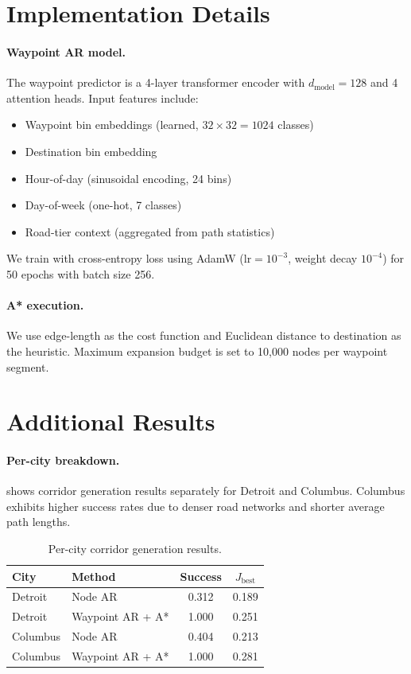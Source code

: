 \section{Implementation Details}
\label{app:impl}

\paragraph{Waypoint AR model.}
The waypoint predictor is a 4-layer transformer encoder with $d_{\mathrm{model}}=128$ and 4 attention heads.
Input features include:
\begin{itemize}
  \item Waypoint bin embeddings (learned, $32 \times 32 = 1024$ classes)
  \item Destination bin embedding
  \item Hour-of-day (sinusoidal encoding, 24 bins)
  \item Day-of-week (one-hot, 7 classes)
  \item Road-tier context (aggregated from path statistics)
\end{itemize}
We train with cross-entropy loss using AdamW ($\text{lr}=10^{-3}$, weight decay $10^{-4}$) for 50 epochs with batch size 256.

\paragraph{A* execution.}
We use edge-length as the cost function and Euclidean distance to destination as the heuristic.
Maximum expansion budget is set to 10,000 nodes per waypoint segment.

\section{Additional Results}
\label{app:results}

\paragraph{Per-city breakdown.}
 shows corridor generation results separately for Detroit and Columbus.
Columbus exhibits higher success rates due to denser road networks and shorter average path lengths.

\begin{table}[h]
  \caption{Per-city corridor generation results.}
  \label{tab:per-city}
  \centering
  \small
  \begin{tabular}{llcc}
    \toprule
    City & Method & Success & $J_{\mathrm{best}}$ \\
    \midrule
    Detroit & Node AR & 0.312 & 0.189 \\
    Detroit & Waypoint AR + A* & 1.000 & 0.251 \\
    \midrule
    Columbus & Node AR & 0.404 & 0.213 \\
    Columbus & Waypoint AR + A* & 1.000 & 0.281 \\
    \bottomrule
  \end{tabular}
\end{table}

